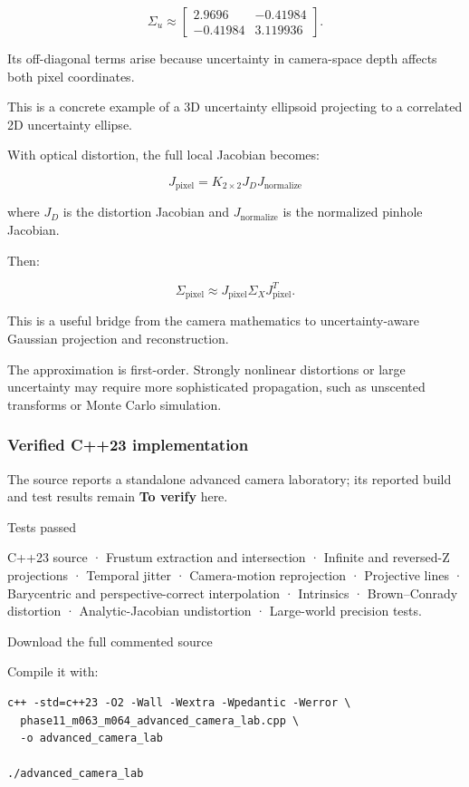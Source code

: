 \[
 \boxed{ \Sigma_u\approx \begin{bmatrix} 2.9696&-0.41984\\ -0.41984&3.119936 \end{bmatrix} }.
\]

Its off-diagonal terms arise because uncertainty in camera-space depth affects both pixel coordinates.

This is a concrete example of a 3D uncertainty ellipsoid projecting to a correlated 2D uncertainty ellipse.

With optical distortion, the full local Jacobian becomes:

\[
 \boxed{ J_{\mathrm{pixel}} = K_{2\times2}J_DJ_{\mathrm{normalize}} }
\]

where \(J_D\) is the distortion Jacobian and \(J_{\mathrm{normalize}}\) is the normalized pinhole Jacobian.

Then:

\[
 \boxed{ \Sigma_{\mathrm{pixel}} \approx J_{\mathrm{pixel}} \Sigma_X J_{\mathrm{pixel}}^T }.
\]

This is a useful bridge from the camera mathematics to uncertainty-aware Gaussian projection and reconstruction.

The approximation is first-order. Strongly nonlinear distortions or large uncertainty may require more sophisticated propagation, such as unscented transforms or Monte Carlo simulation.

\subsubsection{Verified C++23 implementation}\label{verified-c23-implementation}

The source reports a standalone advanced camera laboratory; its reported build and test results remain \textbf{To verify} here.

Tests passed

C++23 source · Frustum extraction and intersection · Infinite and reversed-Z projections · Temporal jitter · Camera-motion reprojection · Projective lines · Barycentric and perspective-correct interpolation · Intrinsics · Brown--Conrady distortion · Analytic-Jacobian undistortion · Large-world precision tests.

Download the full commented source

Compile it with:

\begin{verbatim}
c++ -std=c++23 -O2 -Wall -Wextra -Wpedantic -Werror \
  phase11_m063_m064_advanced_camera_lab.cpp \
  -o advanced_camera_lab

./advanced_camera_lab
\end{verbatim}

